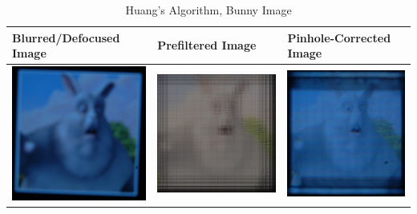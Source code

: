 \begin{table}[!h]
    \caption {Huang's Algorithm, Bunny Image}
    \begin{tabular}{| l | l | l |}
    \hline Blurred/Defocused Image & Prefiltered Image & Pinhole-Corrected Image \\ \hline
      \includegraphics[width=1.9in]{chapters/chapter5/images/Huang_OffAxis_380_250_Origin_Bunny.JPG} &
      \includegraphics[width=1.9in]{chapters/chapter5/images/Huang_prefiltered.PNG} &
      \includegraphics[width=1.9in]{chapters/chapter5/images/Huang_OffAxis_380_250_Pinhole_Bunny.JPG} \\ \hline
    \end{tabular}
\end{table}

